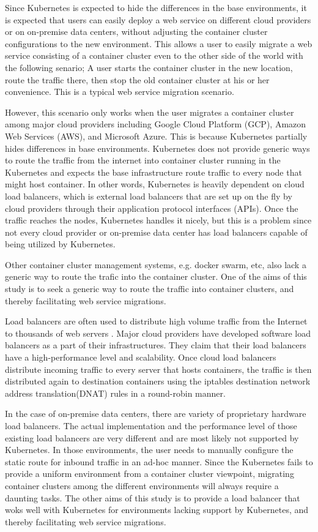 Since Kubernetes is expected to hide the differences in the base environments, it is expected that users can easily deploy a web service on different cloud providers or on on-premise data centers, without adjusting the container cluster configurations to the new environment. 
This allows a user to easily migrate a web service consisting of a container cluster even to the other side of the world with the following senario; 
A user starts the container cluster in the new location, route the traffic there, then stop the old container cluster at his or her convenience.
This is a typical web service migration scenario.

However, this scenario only works when the user migrates a container cluster among major cloud providers including Google Cloud Platform (GCP), Amazon Web Services (AWS), and Microsoft Azure.
This is because Kubernetes partially hides differences in base environments.
Kubernetes does not provide generic ways to route the traffic from the internet into container cluster running in the Kubernetes and expects the base infrastructure route traffic to every node that might host container.
In other words, Kubernetes is heavily dependent on cloud load balancers, which is external load balancers that are set up on the fly by cloud providers through their application protocol interfaces (APIs).
Once the traffic reaches the nodes, Kubernetes handles it nicely, but this is a problem since not every cloud provider or on-premise data center has load balancers capable of being utilized by Kubernetes.

Other container cluster management systems, e.g. docker swarm, etc, also lack a generic way to route the trafic into the container cluster.
One of the aims of this study is to seek a generic way to route the traffic into container clusters, and thereby facilitating web service migrations.

Load balancers are often used to distribute high volume traffic from the Internet to thousands of web servers .
Major cloud providers have developed software load balancers\cite{eisenbud2016maglev,patel2013ananta} as a part of their infrastructures.
They claim that their load balancers have a high-performance level and scalability.
Once cloud load balancers distribute incoming traffic to every server that hosts containers,
the traffic is then distributed again to destination containers using the iptables destination network address translation(DNAT)\cite{MartinA.Brown2017,Marmol2015} rules in a round-robin manner.

In the case of on-premise data centers, there are variety of proprietary hardware load balancers.
The actual implementation and the performance level of those existing load balancers are very different and are most likely not supported by Kubernetes.
In those environments, the user needs to manually configure the static route for inbound traffic in an ad-hoc manner.
Since the Kubernetes fails to provide a uniform environment from a container cluster viewpoint, migrating container clusters among the different environments will always require a daunting tasks.
The other aims of this study is to provide a load balancer that woks well with Kubernetes for environments lacking support by Kubernetes, and thereby facilitating web service migrations.

